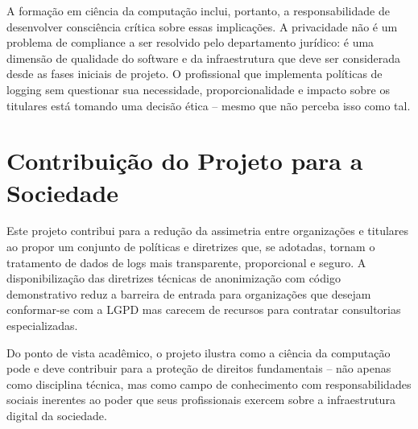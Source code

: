 A formação em ciência da computação inclui, portanto, a responsabilidade de desenvolver consciência crítica sobre essas implicações. A privacidade não é um problema de compliance a ser resolvido pelo departamento jurídico: é uma dimensão de qualidade do software e da infraestrutura que deve ser considerada desde as fases iniciais de projeto. O profissional que implementa políticas de logging sem questionar sua necessidade, proporcionalidade e impacto sobre os titulares está tomando uma decisão ética -- mesmo que não perceba isso como tal.

\section{Contribuição do Projeto para a Sociedade}
\label{sec:contribuicao-social}

Este projeto contribui para a redução da assimetria entre organizações e titulares ao propor um conjunto de políticas e diretrizes que, se adotadas, tornam o tratamento de dados de logs mais transparente, proporcional e seguro. A disponibilização das diretrizes técnicas de anonimização com código demonstrativo reduz a barreira de entrada para organizações que desejam conformar-se com a LGPD mas carecem de recursos para contratar consultorias especializadas.

Do ponto de vista acadêmico, o projeto ilustra como a ciência da computação pode e deve contribuir para a proteção de direitos fundamentais -- não apenas como disciplina técnica, mas como campo de conhecimento com responsabilidades sociais inerentes ao poder que seus profissionais exercem sobre a infraestrutura digital da sociedade.